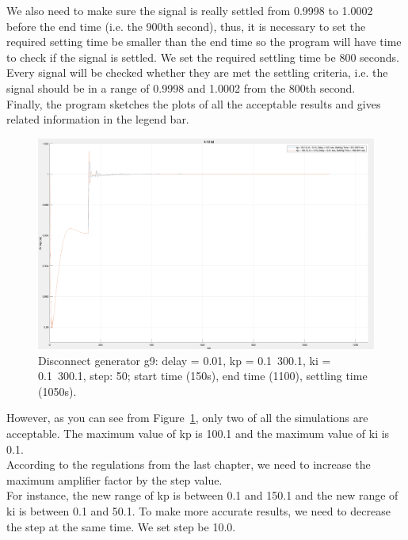 We also need to make sure the signal is really settled from 0.9998 to 1.0002 before the end time (i.e. the 900th second), thus, it is necessary to set the required setting time be smaller than the end time so the program will have time to check if the signal is settled. We set the required settling time be 800 seconds. \\

Every signal will be checked whether they are met the settling criteria, i.e. the signal should be in a range of 0.9998 and 1.0002 from the 800th second.\\

Finally, the program sketches the plots of all the acceptable results and gives related information in the legend bar. \\

\begin{figure}[htbp]
\centering
\includegraphics[width = .819\textwidth]{figure/4_1_2_a.png}
\caption{Disconnect generator g9: delay = 0.01, kp = 0.1~300.1, ki = 0.1~300.1, step: 50; start time (150s), end time (1100), settling time (1050s).}
\label{4_1_2_a}
\end{figure}

However, as you can see from Figure~\ref{4_1_2_a}, only two of all the simulations are acceptable. The maximum value of kp is 100.1 and the maximum value of ki is 0.1. \\

According to the regulations from the last chapter, we need to increase the maximum amplifier factor by the step value. \\

For instance, the new range of kp is between 0.1 and 150.1 and the new range of ki is between 0.1 and 50.1. To make more accurate results, we need to decrease the step at the same time. We set step be 10.0. \\

